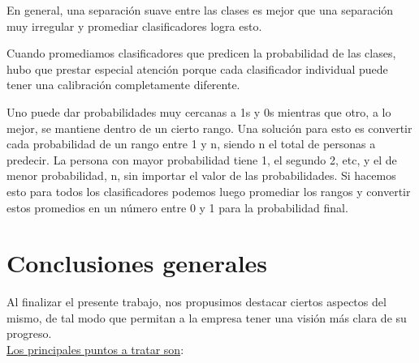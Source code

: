 \documentclass[a4paper ,12pt]{article}
\begin{document}
En general, una separación suave entre las clases es mejor que una separación
muy irregular y promediar clasificadores logra esto.

Cuando promediamos clasificadores que predicen la probabilidad de las clases, hubo
que prestar especial atención porque cada clasificador individual puede tener una calibración completamente diferente. 

Uno puede dar probabilidades muy cercanas a 1s y 0s mientras que otro, a lo mejor, se mantiene dentro de un cierto rango.
Una solución para esto es convertir cada probabilidad de un rango entre 1 y n, siendo n el total de personas a predecir. La persona con mayor probabilidad tiene 1,
el segundo 2, etc, y el de menor probabilidad, n, sin importar el valor de las probabilidades. Si hacemos esto para todos los clasificadores podemos luego
promediar los rangos y convertir estos promedios en un número entre 0 y 1 para la probabilidad final.


\newpage
\section{Conclusiones generales}

Al finalizar el presente trabajo, nos propusimos destacar ciertos aspectos del mismo, de tal modo que permitan a la empresa tener una visión más clara de su progreso.\\


\underline{Los principales puntos a tratar son}:
\end{document}
